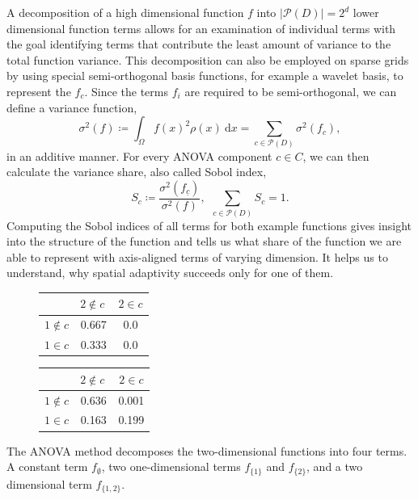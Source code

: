 \documentclass[
  a4paper,  %
  twoside,  %
  bibliography=totoc,
  headsepline,
  cleardoublepage=empty,
  parskip=half,
  draft=false
]{scrbook}
\begin{document}
A decomposition of a high dimensional function $f$ into $|\mathcal{P}(D)|=2^d$ lower dimensional function terms allows for an examination of individual terms with the goal identifying terms that contribute the least amount of variance to the total function variance.
This decomposition can also be employed on sparse grids \cite{Feuersaenger2010} by using special semi-orthogonal basis functions, for example a wavelet basis, to represent the $f_c$.
Since the terms $f_i$ are required to be semi-orthogonal, we can define a variance function,
\begin{equation}
\sigma^2(f) \coloneqq \int_{\Omega} f(x)^2 \rho(x) ~ \text{d} x=\sum_{c \in \mathcal{P}(D)} \sigma^2(f_c),
\end{equation}
in an additive manner.
For every ANOVA component $c \in C$, we can then calculate the variance share, also called Sobol index,
\begin{equation}
S_{c} \coloneqq \frac{\sigma^2(f_{\underline{c}} )}{\sigma^2(f)}, ~~ \sum_{c \in \mathcal{P}(D)} S_{c} = 1.
\end{equation}
Computing the Sobol indices of all terms for both example functions gives insight into the structure of the function and tells us what share of the function we are able to represent with axis-aligned terms of varying dimension.
It helps us to understand, why spatial adaptivity succeeds only for one of them.

\begin{mdframed}[style=style]
\begin{figure}[H]
        \centering
\begin{minipage}[H]{.45\textwidth}
  \centering
  \begin{tabular}{ l c c }
\hline \hline
& $2 \notin c~$ & $2 \in c$ \\
\hline
$1 \notin c$ & 0.667 & 0.0\\
$1 \in c$ & 0.333 & 0.0\\
\end{tabular}
\delimit
  \label{tab:anova_f1}
    \end{minipage}%
    \hspace{.05\textwidth}
    \begin{minipage}[H]{0.45\textwidth}
  \centering
  \begin{tabular}{ l c c }
\hline \hline
& $2 \notin c~$ & $2 \in c$ \\
\hline
$1 \notin c$ & 0.636 & 0.001\\
$1 \in c$ & 0.163 & 0.199\\
\end{tabular}
\delimit
  \label{tab:anova_f2}
    \end{minipage}
\end{figure}
\end{mdframed}
%
The ANOVA method decomposes the two-dimensional functions into four terms.
A constant term $f_\emptyset$, two one-dimensional terms $f_{\{1\}}$ and $f_{\{2\}}$, and a two dimensional term $f_{\{1,2\}}$.
\end{document}
